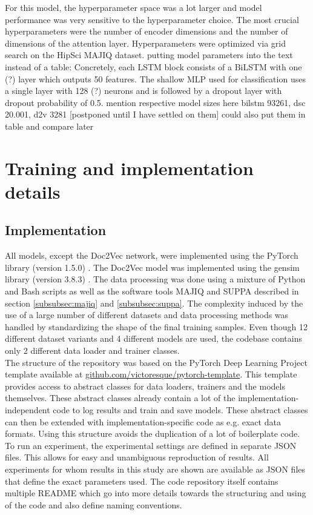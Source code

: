 For this model, the hyperparameter space was a lot larger and model performance was very sensitive to the hyperparameter choice. The most crucial hyperparameters were the number of encoder dimensions and the number of dimensions of the attention layer. Hyperparameters were optimized via grid search on the HipSci MAJIQ dataset.
putting model parameters into the text instead of a table:
Concretely, each LSTM block consists of a BiLSTM with one (?) layer which outputs 50 features.
The shallow MLP used for classification uses a single layer with 128 (?) neurons and is followed by a dropout layer with dropout probability of 0.5.
mention respective model sizes here
bilstm 93261, dsc 20.001, d2v 3281 [postponed until I have settled on them]
could also put them in table and compare later

\section{Training and implementation details}
\subsection{Implementation}
All models, except the Doc2Vec network, were implemented using the PyTorch library (version 1.5.0) \cite{pytorch}. The Doc2Vec model was implemented using the gensim library (version 3.8.3) \cite{gensim}. The data processing was done using a mixture of Python and Bash scripts as well as the software tools MAJIQ and SUPPA described in section \ref{subsubsec:majiq} and \ref{subsubsec:suppa}. The complexity induced by the use of a large number of different datasets and data processing methods was handled by standardizing the shape of the final training samples. Even though 12 different dataset variants and 4 different models are used, the codebase contains only 2 different data loader and trainer classes.\\


The structure of the repository was based on the PyTorch Deep Learning Project template available at \url{github.com/victoresque/pytorch-template}. This template provides access to abstract classes for data loaders, trainers and the models themselves. These abstract classes already contain a lot of the implementation-independent code to log results and train and save models. These abstract classes can then be extended with implementation-specific code as e.g. exact data formats. Using this structure avoids the duplication of a lot of boilerplate code.\\
To run an experiment, the experimental settings are defined in separate JSON files. This allows for easy and unambiguous reproduction of results. All experiments for whom results in this study are shown are available as JSON files that define the exact parameters used.
The code repository itself contains multiple README which go into more details towards the structuring and using of the code and also define naming conventions.\\

